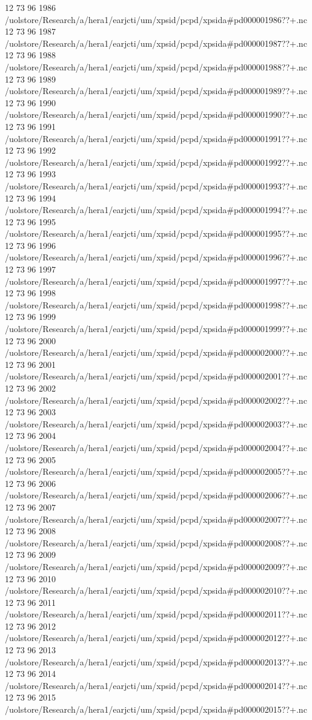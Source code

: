 12 73 96
1986
/uolstore/Research/a/hera1/earjcti/um/xpsid/pcpd/xpsida#pd000001986??+.nc
12 73 96
1987
/uolstore/Research/a/hera1/earjcti/um/xpsid/pcpd/xpsida#pd000001987??+.nc
12 73 96
1988
/uolstore/Research/a/hera1/earjcti/um/xpsid/pcpd/xpsida#pd000001988??+.nc
12 73 96
1989
/uolstore/Research/a/hera1/earjcti/um/xpsid/pcpd/xpsida#pd000001989??+.nc
12 73 96
1990
/uolstore/Research/a/hera1/earjcti/um/xpsid/pcpd/xpsida#pd000001990??+.nc
12 73 96
1991
/uolstore/Research/a/hera1/earjcti/um/xpsid/pcpd/xpsida#pd000001991??+.nc
12 73 96
1992
/uolstore/Research/a/hera1/earjcti/um/xpsid/pcpd/xpsida#pd000001992??+.nc
12 73 96
1993
/uolstore/Research/a/hera1/earjcti/um/xpsid/pcpd/xpsida#pd000001993??+.nc
12 73 96
1994
/uolstore/Research/a/hera1/earjcti/um/xpsid/pcpd/xpsida#pd000001994??+.nc
12 73 96
1995
/uolstore/Research/a/hera1/earjcti/um/xpsid/pcpd/xpsida#pd000001995??+.nc
12 73 96
1996
/uolstore/Research/a/hera1/earjcti/um/xpsid/pcpd/xpsida#pd000001996??+.nc
12 73 96
1997
/uolstore/Research/a/hera1/earjcti/um/xpsid/pcpd/xpsida#pd000001997??+.nc
12 73 96
1998
/uolstore/Research/a/hera1/earjcti/um/xpsid/pcpd/xpsida#pd000001998??+.nc
12 73 96
1999
/uolstore/Research/a/hera1/earjcti/um/xpsid/pcpd/xpsida#pd000001999??+.nc
12 73 96
2000
/uolstore/Research/a/hera1/earjcti/um/xpsid/pcpd/xpsida#pd000002000??+.nc
12 73 96
2001
/uolstore/Research/a/hera1/earjcti/um/xpsid/pcpd/xpsida#pd000002001??+.nc
12 73 96
2002
/uolstore/Research/a/hera1/earjcti/um/xpsid/pcpd/xpsida#pd000002002??+.nc
12 73 96
2003
/uolstore/Research/a/hera1/earjcti/um/xpsid/pcpd/xpsida#pd000002003??+.nc
12 73 96
2004
/uolstore/Research/a/hera1/earjcti/um/xpsid/pcpd/xpsida#pd000002004??+.nc
12 73 96
2005
/uolstore/Research/a/hera1/earjcti/um/xpsid/pcpd/xpsida#pd000002005??+.nc
12 73 96
2006
/uolstore/Research/a/hera1/earjcti/um/xpsid/pcpd/xpsida#pd000002006??+.nc
12 73 96
2007
/uolstore/Research/a/hera1/earjcti/um/xpsid/pcpd/xpsida#pd000002007??+.nc
12 73 96
2008
/uolstore/Research/a/hera1/earjcti/um/xpsid/pcpd/xpsida#pd000002008??+.nc
12 73 96
2009
/uolstore/Research/a/hera1/earjcti/um/xpsid/pcpd/xpsida#pd000002009??+.nc
12 73 96
2010
/uolstore/Research/a/hera1/earjcti/um/xpsid/pcpd/xpsida#pd000002010??+.nc
12 73 96
2011
/uolstore/Research/a/hera1/earjcti/um/xpsid/pcpd/xpsida#pd000002011??+.nc
12 73 96
2012
/uolstore/Research/a/hera1/earjcti/um/xpsid/pcpd/xpsida#pd000002012??+.nc
12 73 96
2013
/uolstore/Research/a/hera1/earjcti/um/xpsid/pcpd/xpsida#pd000002013??+.nc
12 73 96
2014
/uolstore/Research/a/hera1/earjcti/um/xpsid/pcpd/xpsida#pd000002014??+.nc
12 73 96
2015
/uolstore/Research/a/hera1/earjcti/um/xpsid/pcpd/xpsida#pd000002015??+.nc
